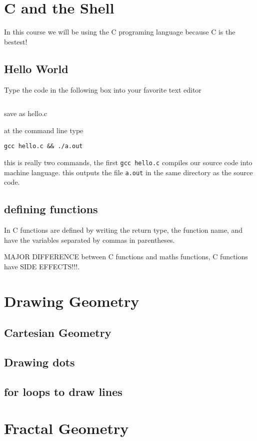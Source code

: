 \documentclass[12pt]{article}
\begin{document}
\section{C and the Shell}
    In this course we will be using the C programing language because C is the bestest!
\subsection{Hello World}
    Type the code in the following box into your favorite text editor
\inputminted{c}{hello.c}
    save as hello.c

    at the command line type

    \texttt{gcc hello.c \&\& ./a.out}

    this is really two commands, the first \texttt{gcc hello.c} compiles our source code into
    machine language. this outputs the file \texttt{a.out} in the same directory as the 
    source code.
\subsection{defining functions}
    In C functions are defined by writing the return type, the function name, and have 
    the variables separated by commas in parentheses.

    MAJOR DIFFERENCE between C functions and maths functions, C functions have SIDE EFFECTS!!!.

\section{Drawing Geometry}
\subsection{Cartesian Geometry}
\subsection{Drawing dots}
\subsection{for loops to draw lines}

\section{Fractal Geometry}
\end{document}
